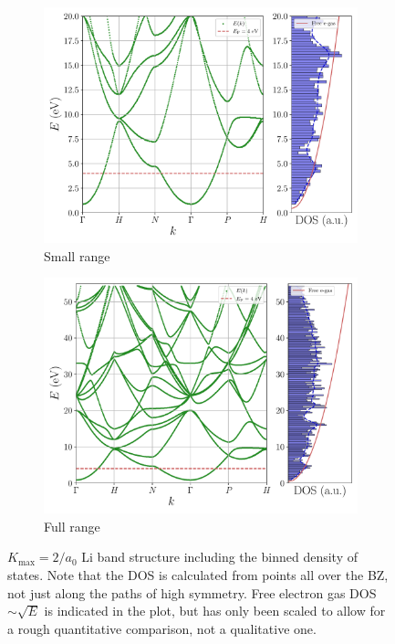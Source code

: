 \documentclass[a4paper,DIV=12,english]{scrartcl}
\begin{document}
\begin{figure}
    \centering
    \begin{subfigure}{0.49\textwidth}
        \centering 
        \includegraphics[width=\textwidth]{../plots/bs_2_R_130_DOS.pdf} 
        \caption{Small range}
        \label{subfig:bs_dos_zoom}        
    \end{subfigure}
    \begin{subfigure}{0.49\textwidth}
        \centering 
        \includegraphics[width=\textwidth]{../plots/bs_2_R_130_full_dos.pdf} 
        \caption{Full range}
        \label{subfig:bs_dos_full}        
    \end{subfigure}
    \caption{$K_\text{max} = 2/a_0$ Li band structure including the binned density of states. Note that the DOS is calculated from points all over the BZ, not just along the paths of high symmetry. Free electron gas DOS $\sim \sqrt{E}$ is indicated in the plot, but has only been scaled to allow for a rough quantitative comparison, not a qualitative one.}
    \label{fig:bs_2_DOS}
\end{figure}
\end{document}
